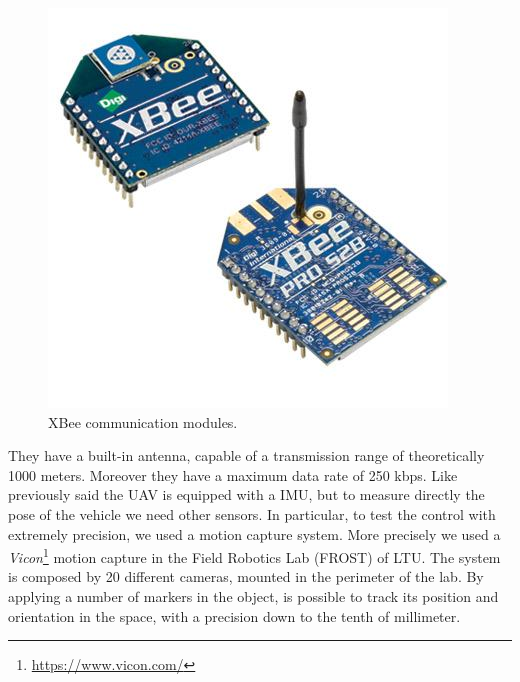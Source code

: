 \begin{figure}[h]
	\centering
	\includegraphics[scale = 0.6]{./images/XBee.jpg}
	\caption{XBee communication modules.}
	\label{fig:XBee}
\end{figure}

\noindent They have a built-in antenna, capable of a transmission range of theoretically 1000 meters. Moreover they have a maximum data rate of 250 kbps. Like previously said the UAV is equipped with a IMU, but to measure directly the pose of the vehicle we need other sensors. In particular, to test the control with extremely precision, we used a motion capture system. More precisely we used a \textit{Vicon}\footnote{\url{https://www.vicon.com/}} motion capture in the Field Robotics Lab (FROST) of LTU. The system is composed by 20 different cameras, mounted in the perimeter of the lab. By applying a number of markers in the object, is possible to track its position and orientation in the space, with a precision down to the tenth of millimeter.

